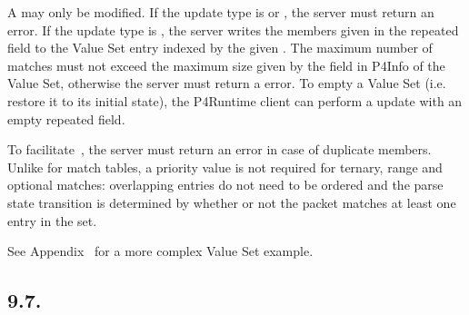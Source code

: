 \documentclass[11pt]{article}
\begin{document}
{%
\noindent{}A  may only be modified. If the update type is  or
, the server must return an  error. If the update type
is , the server writes the members given in the repeated field to the
Value Set entry indexed by the given . The maximum number of
matches must not exceed the maximum size given by the  field in P4Info of
the Value Set, otherwise the server must return a  error. To
empty a Value Set (i.e. restore it to its initial state), the P4Runtime client
can perform a  update with an empty  repeated field.%

To facilitate~, the server must
return an  error in case of duplicate members. Unlike for match
tables, a priority value is not required for ternary, range and optional
matches: overlapping entries do not need to be ordered and the parse state
transition is determined by whether or not the packet matches at least one entry
in the set.%

See Appendix~ for a more complex Value Set example.%

\subsection{9.7.\hspace*{0.5em}}\label{sec-registerentry}%

}
\end{document}

